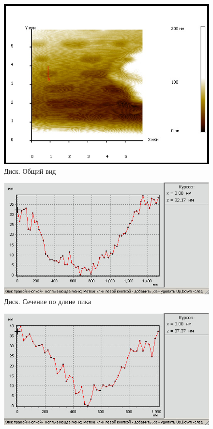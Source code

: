 \documentclass[a4paper,12pt]{article}
\theoremstyle{plain} %
\theoremstyle{definition} %
\theoremstyle{remark} %
\begin{document}
\begin{itemize}
\begin{enumerate}
\begin{figure}[H]
	\centering
	\includegraphics[scale=1]{pic106.jpg}
	\caption{Диск. Общий вид}
	\label{pшс}
\end{figure}
\begin{figure}[H]
	\centering
	\includegraphics[scale=0.7]{pic104.jpg}
	\caption{Диск. Сечение по длине пика}
	\label{pшс}
\end{figure}
\begin{figure}[H]
	\centering
	\includegraphics[scale=0.7]{pic105.jpg}

\end{figure}
\end{enumerate}
\end{itemize}
\end{document}
